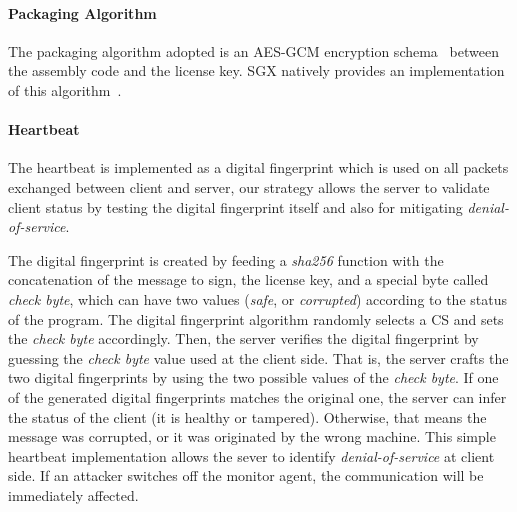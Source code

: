\paragraph{\textbf{Packaging Algorithm}}
The packaging algorithm adopted is an AES-GCM encryption 
schema~\cite{zhou2007efficient} between the assembly code and
the license key.
SGX natively provides an implementation of this algorithm~\cite{rijndael128GCM}.

\paragraph{\textbf{Heartbeat}}
The heartbeat is implemented as a digital fingerprint which is used on all 
packets exchanged between
client and server, our strategy allows the server to validate client status by 
testing the
digital fingerprint itself and also for mitigating \emph{denial-of-service}.

The digital fingerprint is created by feeding a \emph{sha256} function with the
concatenation of the message to sign, the license key, and a special byte called
\emph{check byte}, which can have two values (\emph{safe}, or \emph{corrupted})
according to the status of the program.
The digital fingerprint algorithm randomly selects a CS and sets the 
\emph{check byte}
accordingly.
Then, the server verifies the digital fingerprint by guessing the \emph{check 
byte} value used at the client side.
That is, the server crafts the two digital fingerprints by using the two 
possible values of the \emph{check byte}.
If one of the generated digital fingerprints matches the original one, the 
server can infer the status of the client (\ie it is healthy or tampered).
Otherwise, that means the message was corrupted, or it was originated by the 
wrong machine.
This simple heartbeat implementation allows the sever to 
identify \emph{denial-of-service} at client side. If an
attacker switches off the monitor agent,
the communication will be immediately affected.


